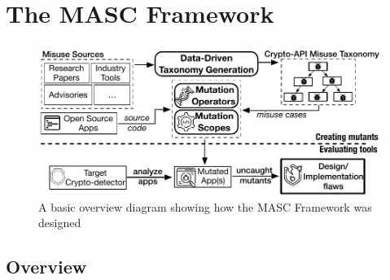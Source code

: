 \chapter{The MASC Framework}
\label{chap_framework}
\begin{figure}[!ht]
	\centering
    \includegraphics[width=0.96\linewidth]{figures/overview.pdf}
	\vspace{-1.em}
    \caption{\small A basic overview diagram showing how the MASC Framework was designed}
    \label{fig:overview}
	
\end{figure}
\section{Overview}
\label{ch2:sec:overview}

